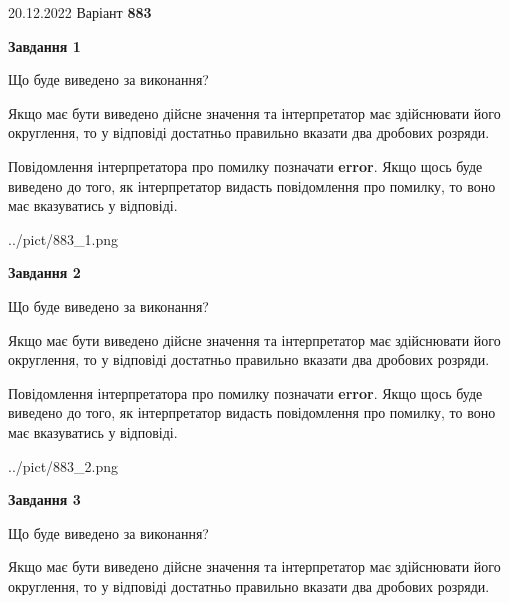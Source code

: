 \documentclass[12pt, ukrainian]{article}
\begin{document}
{20.12.2022 Варіант \No \textbf { 883 }\par}
{
\begin {Large}

{\begin {center}\textbf{Завдання 1}\end {center}}\par
Що буде виведено за виконання? \par

Якщо має бути виведено дійсне значення та інтерпретатор має здійснювати його округлення, 
то у відповіді достатньо правильно вказати два дробових розряди.

Повідомлення інтерпретатора про помилку позначати \textbf{error}.
Якщо щось буде виведено до того, як інтерпретатор видасть повідомлення про помилку, 
то воно має вказуватись у відповіді. \par

\begin{center}
	{../pict/883_1.png}
\end{center}
\newpage

{\begin {center}\textbf{Завдання 2}\end {center}}\par
Що буде виведено за виконання? \par

Якщо має бути виведено дійсне значення та інтерпретатор має здійснювати його округлення, 
то у відповіді достатньо правильно вказати два дробових розряди.

Повідомлення інтерпретатора про помилку позначати \textbf{error}.
Якщо щось буде виведено до того, як інтерпретатор видасть повідомлення про помилку, 
то воно має вказуватись у відповіді. \par

\begin{center}
	{../pict/883_2.png}
\end{center}
\newpage

{\begin {center}\textbf{Завдання 3}\end {center}}\par
Що буде виведено за виконання? \par

Якщо має бути виведено дійсне значення та інтерпретатор має здійснювати його округлення, 
то у відповіді достатньо правильно вказати два дробових розряди.


\end{Large}}
\end{document}
